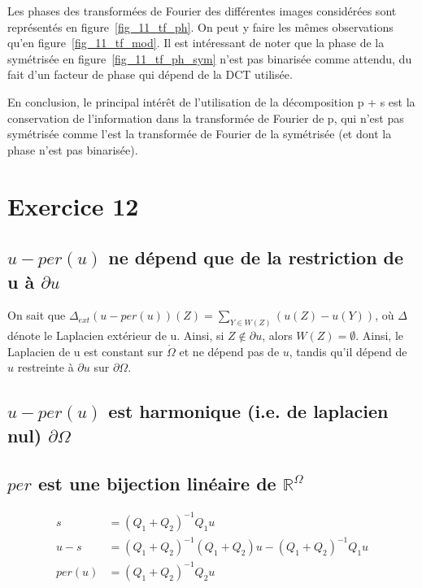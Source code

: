 \documentclass[12pt,a4paper,onecolumn]{article}
\begin{document}
Les phases des transformées de Fourier des différentes images considérées sont représentés en figure~\ref{fig_11_tf_ph}. On peut y faire les mêmes observations qu'en figure~\ref{fig_11_tf_mod}. Il est intéressant de noter que la phase de la symétrisée en figure~\ref{fig_11_tf_ph_sym} n'est pas binarisée comme attendu, du fait d'un facteur de phase qui dépend de la DCT utilisée.

En conclusion, le principal intérêt de l'utilisation de la décomposition p + s est la conservation de l'information dans la transformée de Fourier de p, qui n'est pas symétrisée comme l'est la transformée de Fourier de la symétrisée (et dont la phase n'est pas binarisée).

\section{Exercice 12}

\subsection{\(u - per(u)\) ne dépend que de la restriction de u à \(\partial u\)}

On sait que \( \Delta_{ext}(u - per(u))(Z)= \sum_{Y \in W(Z)}(u(Z) - u(Y))\), où \(\Delta\) dénote le Laplacien extérieur de u. Ainsi, si \(Z \not\in \partial u\), alors \(W(Z) = \emptyset\). Ainsi, le Laplacien de u est constant sur \(\mathring \Omega\) et ne dépend pas de \(u\), tandis qu'il dépend de \(u\) restreinte à \(\partial u\) sur \(\partial \Omega\).

\subsection{\(u - per(u)\) est harmonique (i.e. de laplacien nul) \(\partial \Omega\)}

\subsection{\(per\) est une bijection linéaire de \( \mathbb{R}^{\Omega}\)}

\begin{equation}
	\begin{split}
		s &= \left(Q_1 + Q_2\right)^{-1}Q_1u\\
		u - s &= \left(Q_1 + Q_2\right)^{-1}\left(Q_1 + Q_2\right)u - \left(Q_1 + Q_2\right)^{-1}Q_1u \\
		per(u) &= \left(Q_1 + Q_2\right)^{-1}Q_2u
	\end{split}
	\label{eq_per}
\end{equation}
\end{document}

